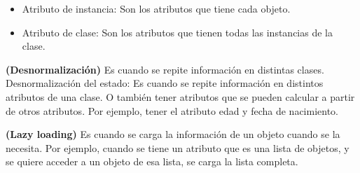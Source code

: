 \documentclass[../main.tex]{subfiles}
\begin{document}
        \begin{itemize}
            \item Atributo de instancia: Son los atributos que tiene cada objeto.
            \item Atributo de clase: Son los atributos que tienen todas las instancias de la clase.
        \end{itemize}

        
        \begin{definition} \textbf{(Desnormalización)}
            Es cuando se repite información en distintas clases.
            Desnormalización del estado: Es cuando se repite información en distintos atributos de una clase. O también tener atributos que se pueden calcular a partir de otros atributos. Por ejemplo, tener el atributo edad y fecha de nacimiento.  
        \end{definition}

        \begin{definition} \textbf{(Lazy loading)}
            Es cuando se carga la información de un objeto cuando se la necesita. Por ejemplo, cuando se tiene un atributo que es una lista de objetos, y se quiere acceder a un objeto de esa lista, se carga la lista completa.
        \end{definition}
\end{document}
